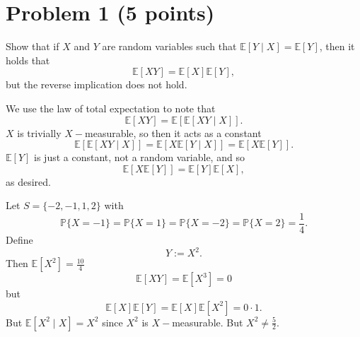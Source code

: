 \documentclass[11pt]{article}
\newcommand{\bbE}{\mathbb{E}}
\newcommand{\bbP}{\mathbb{P}}
\begin{document}
	
	
	\psetheader
\section*{Problem 1 (5 points)}
Show that if \(X\) and \(Y\) are random variables such that \(\mathbb{E}[Y \mid X] = \mathbb{E}[Y]\), then it holds that
\[
\mathbb{E}[XY] = \mathbb{E}[X] \mathbb{E}[Y],
\]
but the reverse implication does not hold.

\begin{solution}
    We use the law of total expectation to note that 
    \[\bbE[XY] = \bbE[\bbE[XY \mid X]].\] $X$ is trivially $X-$measurable, so then it acts as a constant 
    \[\bbE[\bbE[XY \mid X]] = \bbE[X \bbE[Y \mid X]] = \bbE[X \bbE[Y]].\] $\bbE[Y]$ is just a constant, not a random variable, and so 
    \[\bbE[X \bbE[Y]] = \bbE[Y]\bbE[X],\] as desired.

    Let $S= \{-2, -1,1, 2\}$ with 
    \[\bbP\{X = -1\} = \bbP\{X = 1\} = \bbP\{X = -2\} = \bbP\{X = 2\}= \frac{1}{4}.\] Define
    \[Y:= X^2.\] Then $\bbE[X^2] = \frac{10}{4}$
    \[\bbE[XY] = \bbE[X^3] = 0\] but 
    \[\bbE[X]\bbE[Y] =\bbE[X]\bbE[X^2] = 0 \cdot 1.\]
    But $\bbE[X^2 \mid X ] = X^2$ since $X^2$ is $X-$measurable. But $X^2 \neq \frac{5}{2}.$ 
\end{solution}

\newpage
\end{document}
